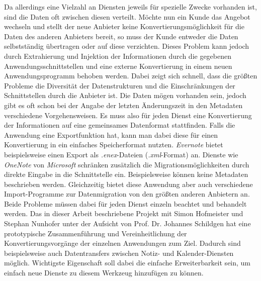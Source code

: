 Da allerdings eine Vielzahl an Diensten jeweils für spezielle Zwecke vorhanden ist, sind die Daten oft zwischen diesen verteilt. Möchte nun ein Kunde das Angebot wechseln und stellt der neue Anbieter keine Konvertierungsmöglichkeit für die Daten des anderen Anbieters bereit, so muss der Kunde entweder die Daten selbstständig übertragen oder auf diese verzichten. Dieses Problem kann jedoch durch Extrahierung und Injektion der Informationen durch die gegebenen Anwendungsschnittstellen und eine externe Konvertierung in einem neuen Anwendungsprogramm behoben werden. Dabei zeigt sich schnell, dass die größten Probleme die Diversität der Datenstrukturen und die Einschränkungen der Schnittstellen durch die Anbieter ist. Die Daten mögen vorhanden sein, jedoch gibt es oft schon bei der Angabe der letzten Änderungszeit in den Metadaten verschiedene Vorgehensweisen. Es muss also für jeden Dienst eine Konvertierung der Informationen auf eine gemeinsames Datenformat stattfinden. Falls die Anwendung eine Exportfunktion hat, kann man dabei diese für einen Konvertierung in ein einfaches Speicherformat nutzten. \textit{Evernote} bietet beispielsweise einen Export als \textit{.enex}-Dateien (\textit{.xml}-Format) an. Dienste wie \textit{OneNote} von \textit{Microsoft} schränken zusätzlich die Migrationsmöglichkeiten durch direkte Eingabe in die Schnittstelle ein. Beispielsweise können keine Metadaten beschrieben werden. Gleichzeitig bietet diese Anwendung aber auch verschiedene Import-Programme zur Datenmigration von den größten anderen Anbietern an. Beide Probleme müssen dabei für jeden Dienst einzeln beachtet und behandelt werden. Das in dieser Arbeit beschriebene Projekt mit Simon Hofmeister und Stephan Nunhofer unter der Aufsicht von Prof. Dr. Johannes Schildgen hat eine prototypische Zusammenführung und Vereinheitlichung der Konvertierungsvorgänge der einzelnen Anwendungen zum Ziel. Dadurch sind beispielsweise auch Datentransfers zwischen Notiz- und Kalender-Diensten möglich. Wichtigste Eigenschaft soll dabei die einfache Erweiterbarkeit sein, um einfach neue Dienste zu diesem Werkzeug hinzufügen zu können. 